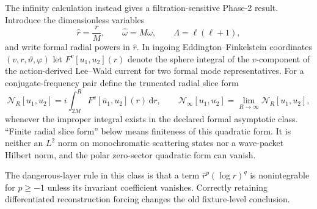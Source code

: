 \documentclass[11pt]{article}
\newcommand{\dd}{\mathrm d}
\begin{document}
The infinity calculation instead gives a filtration-sensitive Phase-2
result.  Introduce the dimensionless variables
\begin{equation}
 \widehat r=\frac rM,
 \qquad \widehat\omega=M\omega,
 \qquad \Lambda=\ell(\ell+1),
 \label{eq:schwarzschild-dimensionless}
\end{equation}
and write formal radial powers in $\widehat r$.  In ingoing
Eddington--Finkelstein coordinates $(v,r,\vartheta,\varphi)$ let
$F^v[u_1,u_2](r)$ denote the sphere integral of the $v$-component of the
action-derived Lee--Wald current for two formal mode representatives.  For a
conjugate-frequency pair define the truncated radial slice form
\begin{equation}
 \mathcal N_R[u_1,u_2]
 =i\int_{2M}^{R}F^v[\bar u_1,u_2](r)\,\dd r,
 \qquad
 \mathcal N_\infty[u_1,u_2]=\lim_{R\to\infty}\mathcal N_R[u_1,u_2],
 \label{eq:schwarzschild-radial-pairing}
\end{equation}
whenever the improper integral exists in the declared formal asymptotic
class.  ``Finite radial slice form'' below means finiteness of this quadratic
form.  It is neither an $L^2$ norm on monochromatic scattering states nor a
wave-packet Hilbert norm, and the polar zero-sector quadratic form can vanish.

The dangerous-layer rule in this class is that a term
$\widehat r^p(\log \widehat r)^q$ is nonintegrable for $p\ge-1$ unless its invariant
coefficient vanishes.  Correctly retaining differentiated reconstruction
forcing changes the old fixture-level conclusion.
\end{document}

